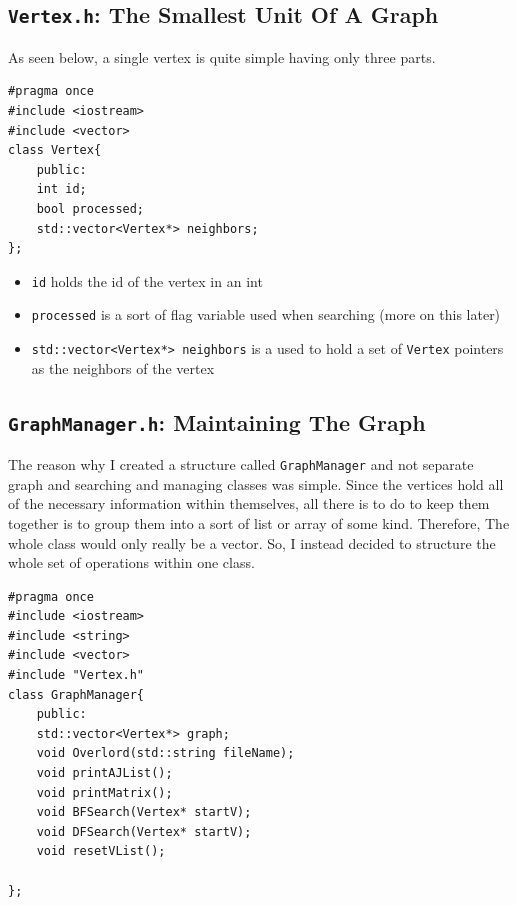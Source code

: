 \documentclass[letterpaper, 10pt]{article}
\begin{document}
\subsection{\texttt{Vertex.h}: The Smallest Unit Of A Graph}

As seen below, a single vertex is quite simple having only three parts.

 \begin{addmargin}[-5em]{1em}
\begin{small}
\begin{verbatim}
#pragma once
#include <iostream>
#include <vector>
class Vertex{
    public:
    int id;
    bool processed;
    std::vector<Vertex*> neighbors;
};
\end{verbatim}
\end{small}
\end{addmargin}
\begin{itemize}
    \item \texttt{id} holds the id of the vertex in an int
    \item \texttt{processed} is a sort of flag variable used when searching (more on this later)
    \item \texttt{std::vector<Vertex*> neighbors} is a used to hold a set of \texttt{Vertex} pointers as the neighbors of the vertex
\end{itemize}

\subsection{\texttt{GraphManager.h}: Maintaining The Graph}

The reason why I created a structure called \texttt{GraphManager} and not separate graph and searching and managing classes was simple. Since the vertices hold all of the necessary information within themselves, all there is to do to keep them together is to group them into a sort of list or array of some kind. Therefore, The whole class would only really be a vector. So, I instead decided to structure the whole set of operations within one class.

 \begin{addmargin}[-5em]{1em}
\begin{small}
\begin{verbatim}
#pragma once
#include <iostream>
#include <string>
#include <vector>
#include "Vertex.h"
class GraphManager{
    public:
    std::vector<Vertex*> graph;
    void Overlord(std::string fileName);
    void printAJList();
    void printMatrix();
    void BFSearch(Vertex* startV);
    void DFSearch(Vertex* startV);
    void resetVList();
    
};
\end{verbatim}
\end{small}
\end{addmargin}
\end{document}
